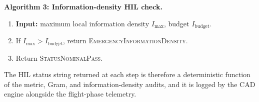 \noindent\textbf{Algorithm 3: Information-density HIL check.}
\begin{enumerate}
\item \textbf{Input:} maximum local information density $I_{\max}$, budget $I_{\mathrm{budget}}$.
\item If $I_{\max}>I_{\mathrm{budget}}$, return \textsc{EmergencyInformationDensity}.
\item Return \textsc{StatusNominalPass}.
\end{enumerate}

The HIL status string returned at each step is therefore a deterministic
function of the metric, Gram, and information-density audits, and it is
logged by the CAD engine alongside the flight-phase telemetry.
